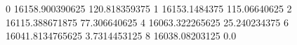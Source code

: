 0 16158.900390625 120.818359375
1 16153.1484375 115.06640625
2 16115.388671875 77.306640625
4 16063.322265625 25.240234375
6 16041.8134765625 3.7314453125
8 16038.08203125 0.0
